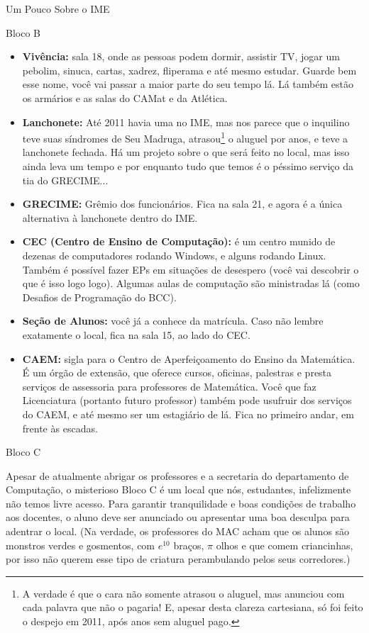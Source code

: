 \begin{secao}{Um Pouco Sobre o IME}
\begin{subsecao}{Bloco B}
\begin{itemize}
\item {\bf Vivência:} sala 18, onde as pessoas podem dormir, assistir TV, jogar
um pebolim, sinuca, cartas, xadrez, fliperama e até mesmo estudar. Guarde bem
esse nome, você vai passar a maior parte do seu tempo lá. Lá também estão os
armários e as salas do CAMat e da Atlética. 

\item {\bf Lanchonete:} Até 2011 havia uma no IME, mas nos parece que o inquilino
teve suas síndromes de Seu Madruga, atrasou\footnote{A verdade é que o cara não
somente atrasou o aluguel, mas anunciou com cada palavra que não o pagaria! E,
apesar desta clareza cartesiana, só foi feito o despejo em 2011, após anos sem
aluguel pago.} o aluguel por anos, e teve a lanchonete fechada. Há um projeto
sobre o que será feito no local, mas isso ainda leva um tempo e por enquanto
tudo que temos é o péssimo serviço da tia do GRECIME... 

\item {\bf GRECIME:} Grêmio dos funcionários. Fica na sala 21, e agora é a única
alternativa à lanchonete dentro do IME.

\item {\bf CEC (Centro de Ensino de Computação):} é um centro munido de dezenas
de computadores rodando Windows, e alguns rodando Linux. Também é possível fazer
EPs em situações de desespero (você vai descobrir o que é isso logo logo). Algumas
aulas de computação são ministradas lá (como Desafios de Programação do BCC).
 
\item {\bf Seção de Alunos:} você já a conhece da matrícula. Caso não lembre
exatamente o local, fica na sala 15, ao lado do CEC.

\item {\bf CAEM:} sigla para o Centro de Aperfeiçoamento do Ensino da Matemática.
É um órgão de extensão, que oferece cursos, oficinas, palestras e presta serviços
de assessoria para professores de Matemática. Você que faz Licenciatura (portanto
futuro professor) também pode usufruir dos serviços do CAEM, e até mesmo ser um
estagiário de lá. Fica no primeiro andar, em frente às escadas.

\end{itemize}
\end{subsecao}

\begin{subsecao}{Bloco C}

Apesar de atualmente abrigar os professores e a secretaria do departamento de
Computação, o misterioso Bloco C é um local que nós, estudantes, infelizmente não
temos livre acesso. Para garantir tranquilidade e boas condições de trabalho aos
docentes, o aluno deve ser anunciado ou apresentar uma boa desculpa para adentrar
o local. (Na verdade, os professores do MAC acham que os alunos são monstros
verdes e gosmentos, com $e^{10}$ braços, $\pi$ olhos e que comem criancinhas,
por isso não querem esse tipo de criatura perambulando pelos seus corredores.)


\end{subsecao}
\end{secao}
